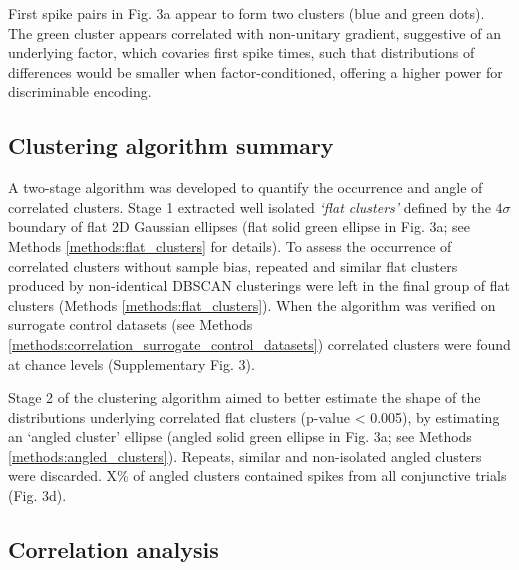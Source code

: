 \documentclass{article}
\begin{document}
First spike pairs in Fig. 3a appear to form two clusters (blue and green dots). The green cluster appears correlated with non-unitary gradient, suggestive of an underlying factor, which covaries first spike times, such that distributions of differences would be smaller when factor-conditioned, offering a higher power for discriminable encoding. 


\subsection*{Clustering algorithm summary}
A two-stage algorithm was developed to quantify the occurrence and angle of correlated clusters. 
Stage 1 extracted well isolated \textit{`flat clusters'} defined by the $4\sigma$ boundary of flat 2D Gaussian ellipses (flat solid green ellipse in Fig. 3a; see Methods \ref{methods:flat_clusters} for details).  
To assess the occurrence of correlated clusters without sample bias, repeated and similar flat clusters produced by non-identical DBSCAN clusterings were left in the final group of flat clusters (Methods \ref{methods:flat_clusters}). When the algorithm was verified on surrogate control datasets (see Methods \ref{methods:correlation_surrogate_control_datasets}) correlated clusters were found at chance levels (Supplementary Fig. 3). 

Stage 2 of the clustering algorithm aimed to better estimate the shape of the distributions underlying correlated flat clusters (p-value < 0.005), by estimating an `angled cluster' ellipse (angled solid green ellipse in Fig. 3a; see Methods \ref{methods:angled_clusters}). Repeats, similar and non-isolated angled clusters were discarded. 
 
X\% of angled clusters contained spikes from all conjunctive trials (Fig. 3d).


\subsection*{Correlation analysis}
\end{document}
